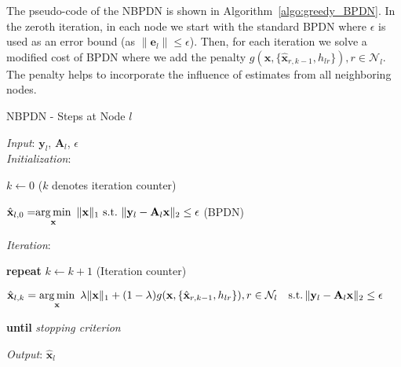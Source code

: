 \documentclass[journal]{IEEEtran}
\newcommand{\mbx}{\mathbf{x}}
\newcommand{\mbe}{\mathbf{e}}
\DeclareMathOperator*{\argmin}{arg\,min}
\newcommand*{\argminl}{\argmin\limits}
\begin{document}
The pseudo-code of the NBPDN is shown in Algorithm~\ref{algo:greedy_BPDN}. In the zeroth iteration, in each node we start with the standard BPDN where $\epsilon$ is used as an error bound (as $\| \mbe_l \| \leq \epsilon$). Then, for each iteration we solve a modified cost of BPDN where we add the penalty $g(\mbx,\{\hat{\mbx}_{r,k-1}, h_{lr}\}), r \in \mathcal{N}_l$. The penalty helps to incorporate the influence of estimates from all neighboring nodes.  
\begin{algorithm}
\caption{NBPDN - Steps at Node $l$} \label{algo:greedy_BPDN}
\emph{Input}: $\mathbf{y}_l$, $\mathbf{A}_l$, $\epsilon$ \\
\emph{Initialization}:
\begin{algorithmic}
\State $k \gets 0$ \hfill ($k$ denotes iteration counter)
\end{algorithmic}
\begin{algorithmic}[1]
\State
$\hat{\mathbf{x}}_{l,0} = \hspace{-1mm} \argminl\limits_{\mathbf{x}} \,\, \|\mathbf{x}\|_{1} \,\, \text{s.t.} \,\, \|\mathbf{y}_l - \mathbf{A}_l \mathbf{x}\|_{2} \leq \epsilon $  \hfill (BPDN)
\end{algorithmic}
\emph{Iteration}:
\begin{algorithmic}
\State \textbf{repeat}
\State $k \gets k+1$ \hfill (Iteration counter)
\end{algorithmic}
\begin{algorithmic}[1]
\State $\hat{\mbx}_{l,k}  =  \argminl\limits_{\mbx}  \,\, \lambda \|\mathbf{x}\|_{1}+(1-\lambda)g(\mbx,\{\hat{\mbx}_{r,k-1}, h_{lr}\}), r \in \mathcal{N}_l  \,\,\,\,\ \text{s.t.} \, \|\mathbf{y}_l - \mathbf{A}_l \mathbf{x}\|_{2} \leq \epsilon$ 
\end{algorithmic}
\begin{algorithmic}
\State \textbf{until} \emph{stopping criterion}
\end{algorithmic}
\emph{Output}: $\hat{\mathbf{x}}_{l}$
\end{algorithm}
\end{document}

